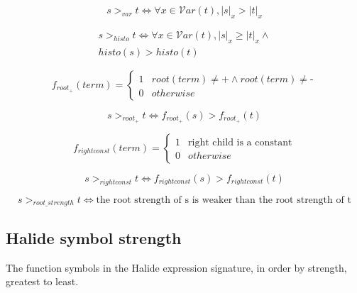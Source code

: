 \documentclass[sigplan,10pt,review,anonymous]{acmart}\settopmatter{printfolios=true,printccs=false,printacmref=false}
\begin{document}
\begin{equation}
s >_{var} t \iff \forall x \in \mathcal{V}ar(t), |s|_x > |t|_x
\end{equation}

\begin{equation}
\begin{split}
s >_{histo} t \iff \forall x \in \mathcal{V}ar(t), |s|_x \geq |t|_x \wedge \\
histo(s) > histo(t)
\end{split}
\end{equation}

\[
f_{root_{\texttt{+}}}(term) = \begin{cases}
                          1 & root(term) \neq \texttt{+} \wedge root(term) \neq \texttt{-} \\
                          0 & otherwise
                          \end{cases}
\]

\begin{equation}
s >_{root_{\texttt{+}}} t \iff f_{root_{\texttt{+}}}(s) > f_{root_{\texttt{+}}}(t)
\end{equation}

\[
f_{rightconst}(term) = \begin{cases}
                          1 & \textrm{right child is a constant} \\
                          0 & otherwise
                        \end{cases}
\]

\begin{equation}
s >_{rightconst} t \iff f_{rightconst}(s) > f_{rightconst}(t)
\end{equation}

\begin{equation}
s >_{root\_strength} t \iff \textrm{the root strength of s is weaker than the root strength of t}
\end{equation}


\subsection{Halide symbol strength} \label{symbolstrength}

The function symbols in the Halide expression signature, in order by strength, greatest to least.
\end{document}
